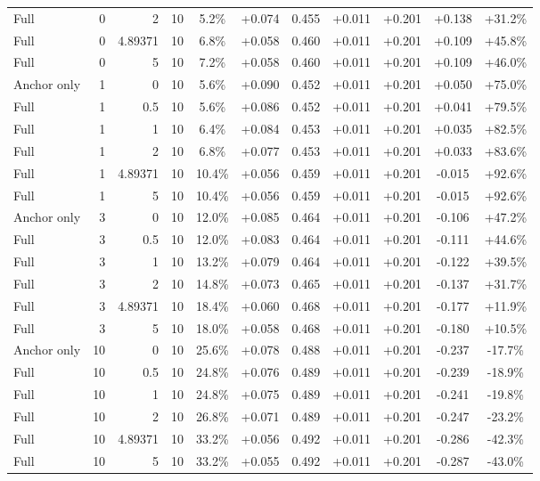 \begin{table}[htbp]
\begin{tabular}{lrrrccccccc}
Full & 0 & 2 & 10 & 5.2\% & +0.074 & 0.455 & +0.011 & +0.201 & +0.138 & +31.2\% \\
Full & 0 & 4.89371 & 10 & 6.8\% & +0.058 & 0.460 & +0.011 & +0.201 & +0.109 & +45.8\% \\
Full & 0 & 5 & 10 & 7.2\% & +0.058 & 0.460 & +0.011 & +0.201 & +0.109 & +46.0\% \\
Anchor only & 1 & 0 & 10 & 5.6\% & +0.090 & 0.452 & +0.011 & +0.201 & +0.050 & +75.0\% \\
Full & 1 & 0.5 & 10 & 5.6\% & +0.086 & 0.452 & +0.011 & +0.201 & +0.041 & +79.5\% \\
Full & 1 & 1 & 10 & 6.4\% & +0.084 & 0.453 & +0.011 & +0.201 & +0.035 & +82.5\% \\
Full & 1 & 2 & 10 & 6.8\% & +0.077 & 0.453 & +0.011 & +0.201 & +0.033 & +83.6\% \\
Full & 1 & 4.89371 & 10 & 10.4\% & +0.056 & 0.459 & +0.011 & +0.201 & -0.015 & +92.6\% \\
Full & 1 & 5 & 10 & 10.4\% & +0.056 & 0.459 & +0.011 & +0.201 & -0.015 & +92.6\% \\
Anchor only & 3 & 0 & 10 & 12.0\% & +0.085 & 0.464 & +0.011 & +0.201 & -0.106 & +47.2\% \\
Full & 3 & 0.5 & 10 & 12.0\% & +0.083 & 0.464 & +0.011 & +0.201 & -0.111 & +44.6\% \\
Full & 3 & 1 & 10 & 13.2\% & +0.079 & 0.464 & +0.011 & +0.201 & -0.122 & +39.5\% \\
Full & 3 & 2 & 10 & 14.8\% & +0.073 & 0.465 & +0.011 & +0.201 & -0.137 & +31.7\% \\
Full & 3 & 4.89371 & 10 & 18.4\% & +0.060 & 0.468 & +0.011 & +0.201 & -0.177 & +11.9\% \\
Full & 3 & 5 & 10 & 18.0\% & +0.058 & 0.468 & +0.011 & +0.201 & -0.180 & +10.5\% \\
Anchor only & 10 & 0 & 10 & 25.6\% & +0.078 & 0.488 & +0.011 & +0.201 & -0.237 & -17.7\% \\
Full & 10 & 0.5 & 10 & 24.8\% & +0.076 & 0.489 & +0.011 & +0.201 & -0.239 & -18.9\% \\
Full & 10 & 1 & 10 & 24.8\% & +0.075 & 0.489 & +0.011 & +0.201 & -0.241 & -19.8\% \\
Full & 10 & 2 & 10 & 26.8\% & +0.071 & 0.489 & +0.011 & +0.201 & -0.247 & -23.2\% \\
Full & 10 & 4.89371 & 10 & 33.2\% & +0.056 & 0.492 & +0.011 & +0.201 & -0.286 & -42.3\% \\
Full & 10 & 5 & 10 & 33.2\% & +0.055 & 0.492 & +0.011 & +0.201 & -0.287 & -43.0\% \\

\end{tabular}
\end{table}
